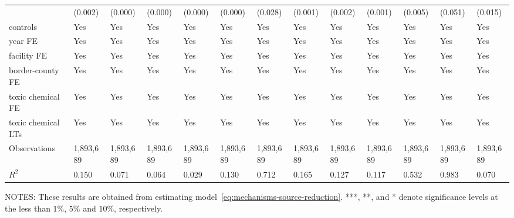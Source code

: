 \begin{table}[H]
{\begin{tabular}{@{}lllllllllllll@{}}
            & (0.002)    & (0.000)             & (0.000)                & (0.000)         & (0.000)      & (0.028)    & (0.001)   & (0.002)   & (0.001)       & (0.005)  & (0.051)    & (0.015)  \\
            controls           & Yes        & Yes                 & Yes                    & Yes             & Yes          & Yes        & Yes       & Yes       & Yes           & Yes           & Yes                    & Yes       \\
            year FE            & Yes        & Yes                 & Yes                    & Yes             & Yes          & Yes        & Yes       & Yes       & Yes           & Yes           & Yes                    & Yes       \\
            facility FE        & Yes        & Yes                 & Yes                    & Yes             & Yes          & Yes        & Yes       & Yes       & Yes           & Yes           & Yes                    & Yes       \\
            border-county FE   & Yes        & Yes                 & Yes                    & Yes             & Yes          & Yes        & Yes       & Yes       & Yes           & Yes           & Yes                    & Yes       \\
            toxic chemical FE  & Yes        & Yes                 & Yes                    & Yes             & Yes          & Yes        & Yes       & Yes       & Yes           & Yes           & Yes                    & Yes       \\
            toxic chemical LTs & Yes        & Yes                 & Yes                    & Yes             & Yes          & Yes        & Yes       & Yes       & Yes           & Yes           & Yes                    & Yes       \\\midrule
            Observations       & 1,893,689  & 1,893,689           & 1,893,689              & 1,893,689       & 1,893,689    & 1,893,689  & 1,893,689 & 1,893,689 & 1,893,689     & 1,893,689  & 1,893,689  & 1,893,689 \\
            $R^2$              & 0.150      & 0.071               & 0.064                  & 0.029           & 0.130        & 0.712      & 0.165     & 0.127     & 0.117         & 0.532         & 0.983                  & 0.070     \\ \bottomrule\bottomrule
        \end{tabular}%
    }
    \begin{minipage}{14cm}
        \vspace{0.05in}
        NOTES: These results are obtained from estimating model~\ref{eq:mechanisms-source-reduction}. ***, **, and * denote significance levels at the less than $1\%$, $5\%$ and $10\%$, respectively.
    \end{minipage}
\end{table}